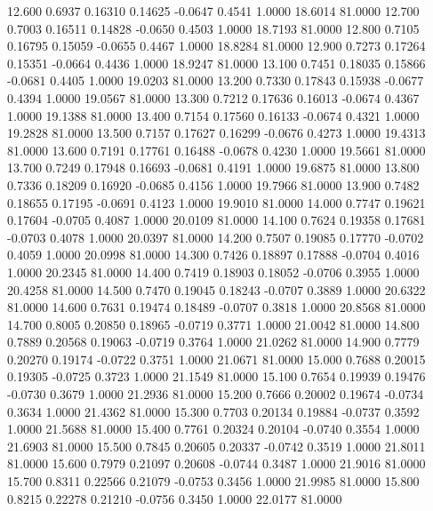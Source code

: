   12.600   0.6937   0.16310   0.14625  -0.0647   0.4541   1.0000  18.6014  81.0000
  12.700   0.7003   0.16511   0.14828  -0.0650   0.4503   1.0000  18.7193  81.0000
  12.800   0.7105   0.16795   0.15059  -0.0655   0.4467   1.0000  18.8284  81.0000
  12.900   0.7273   0.17264   0.15351  -0.0664   0.4436   1.0000  18.9247  81.0000
  13.100   0.7451   0.18035   0.15866  -0.0681   0.4405   1.0000  19.0203  81.0000
  13.200   0.7330   0.17843   0.15938  -0.0677   0.4394   1.0000  19.0567  81.0000
  13.300   0.7212   0.17636   0.16013  -0.0674   0.4367   1.0000  19.1388  81.0000
  13.400   0.7154   0.17560   0.16133  -0.0674   0.4321   1.0000  19.2828  81.0000
  13.500   0.7157   0.17627   0.16299  -0.0676   0.4273   1.0000  19.4313  81.0000
  13.600   0.7191   0.17761   0.16488  -0.0678   0.4230   1.0000  19.5661  81.0000
  13.700   0.7249   0.17948   0.16693  -0.0681   0.4191   1.0000  19.6875  81.0000
  13.800   0.7336   0.18209   0.16920  -0.0685   0.4156   1.0000  19.7966  81.0000
  13.900   0.7482   0.18655   0.17195  -0.0691   0.4123   1.0000  19.9010  81.0000
  14.000   0.7747   0.19621   0.17604  -0.0705   0.4087   1.0000  20.0109  81.0000
  14.100   0.7624   0.19358   0.17681  -0.0703   0.4078   1.0000  20.0397  81.0000
  14.200   0.7507   0.19085   0.17770  -0.0702   0.4059   1.0000  20.0998  81.0000
  14.300   0.7426   0.18897   0.17888  -0.0704   0.4016   1.0000  20.2345  81.0000
  14.400   0.7419   0.18903   0.18052  -0.0706   0.3955   1.0000  20.4258  81.0000
  14.500   0.7470   0.19045   0.18243  -0.0707   0.3889   1.0000  20.6322  81.0000
  14.600   0.7631   0.19474   0.18489  -0.0707   0.3818   1.0000  20.8568  81.0000
  14.700   0.8005   0.20850   0.18965  -0.0719   0.3771   1.0000  21.0042  81.0000
  14.800   0.7889   0.20568   0.19063  -0.0719   0.3764   1.0000  21.0262  81.0000
  14.900   0.7779   0.20270   0.19174  -0.0722   0.3751   1.0000  21.0671  81.0000
  15.000   0.7688   0.20015   0.19305  -0.0725   0.3723   1.0000  21.1549  81.0000
  15.100   0.7654   0.19939   0.19476  -0.0730   0.3679   1.0000  21.2936  81.0000
  15.200   0.7666   0.20002   0.19674  -0.0734   0.3634   1.0000  21.4362  81.0000
  15.300   0.7703   0.20134   0.19884  -0.0737   0.3592   1.0000  21.5688  81.0000
  15.400   0.7761   0.20324   0.20104  -0.0740   0.3554   1.0000  21.6903  81.0000
  15.500   0.7845   0.20605   0.20337  -0.0742   0.3519   1.0000  21.8011  81.0000
  15.600   0.7979   0.21097   0.20608  -0.0744   0.3487   1.0000  21.9016  81.0000
  15.700   0.8311   0.22566   0.21079  -0.0753   0.3456   1.0000  21.9985  81.0000
  15.800   0.8215   0.22278   0.21210  -0.0756   0.3450   1.0000  22.0177  81.0000
